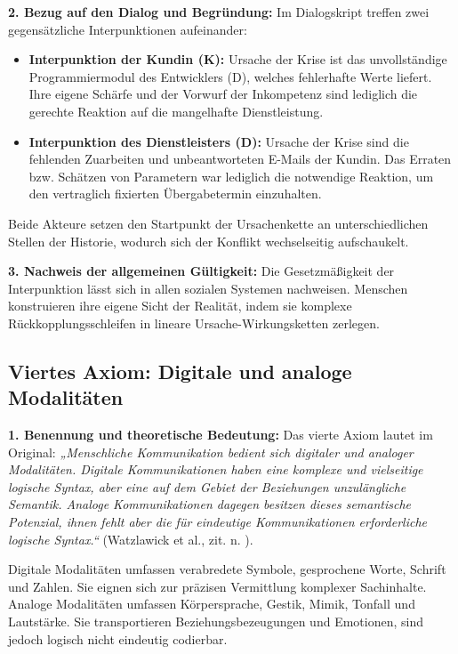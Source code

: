 \textbf{2. Bezug auf den Dialog und Begründung:}
Im Dialogskript treffen zwei gegensätzliche Interpunktionen aufeinander:
\begin{itemize}
    \item \textbf{Interpunktion der Kundin (K):} Ursache der Krise ist das unvollständige Programmiermodul des Entwicklers (D), welches fehlerhafte Werte liefert. Ihre eigene Schärfe und der Vorwurf der Inkompetenz sind lediglich die gerechte Reaktion auf die mangelhafte Dienstleistung.
    \item \textbf{Interpunktion des Dienstleisters (D):} Ursache der Krise sind die fehlenden Zuarbeiten und unbeantworteten E-Mails der Kundin. Das Erraten bzw. Schätzen von Parametern war lediglich die notwendige Reaktion, um den vertraglich fixierten Übergabetermin einzuhalten.
\end{itemize}
Beide Akteure setzen den Startpunkt der Ursachenkette an unterschiedlichen Stellen der Historie, wodurch sich der Konflikt wechselseitig aufschaukelt.

\textbf{3. Nachweis der allgemeinen Gültigkeit:}
Die Gesetzmäßigkeit der Interpunktion lässt sich in allen sozialen Systemen nachweisen. Menschen konstruieren ihre eigene Sicht der Realität, indem sie komplexe Rückkopplungsschleifen in lineare Ursache-Wirkungsketten zerlegen.

\subsection{Viertes Axiom: Digitale und analoge Modalitäten}

\textbf{1. Benennung und theoretische Bedeutung:}
Das vierte Axiom lautet im Original: \textit{„Menschliche Kommunikation bedient sich digitaler und analoger Modalitäten. Digitale Kommunikationen haben eine komplexe und vielseitige logische Syntax, aber eine auf dem Gebiet der Beziehungen unzulängliche Semantik. Analoge Kommunikationen dagegen besitzen dieses semantische Potenzial, ihnen fehlt aber die für eindeutige Kommunikationen erforderliche logische Syntax.“} (Watzlawick et al., zit. n. \cite[S.~14--15]{3}).

Digitale Modalitäten umfassen verabredete Symbole, gesprochene Worte, Schrift und Zahlen. Sie eignen sich zur präzisen Vermittlung komplexer Sachinhalte. Analoge Modalitäten umfassen Körpersprache, Gestik, Mimik, Tonfall und Lautstärke. Sie transportieren Beziehungsbezeugungen und Emotionen, sind jedoch logisch nicht eindeutig codierbar.

